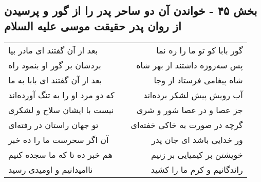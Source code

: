 \begin{center}
\section*{بخش ۴۵ - خواندن آن دو ساحر پدر را از گور و پرسیدن از روان پدر حقیقت موسی علیه السلام}
\label{sec:sh045}
\begin{longtable}{l p{0.5cm} r}
بعد از آن گفتند ای مادر بیا
&&
گور بابا کو تو ما را ره نما
\\
بردشان بر گور او بنمود راه
&&
پس سه‌روزه داشتند از بهر شاه
\\
بعد از آن گفتند ای بابا به ما
&&
شاه پیغامی فرستاد از وجا
\\
که دو مرد او را به تنگ آورده‌اند
&&
آب رویش پیش لشکر برده‌اند
\\
نیست با ایشان سلاح و لشکری
&&
جز عصا و در عصا شور و شری
\\
تو جهان راستان در رفته‌ای
&&
گرچه در صورت به خاکی خفته‌ای
\\
آن اگر سحرست ما را ده خبر
&&
ور خدایی باشد ای جان پدر
\\
هم خبر ده تا که ما سجده کنیم
&&
خویشتن بر کیمیایی بر زنیم
\\
ناامیدانیم و اومیدی رسید
&&
راندگانیم و کرم ما را کشید
\\
\end{longtable}
\end{center}
